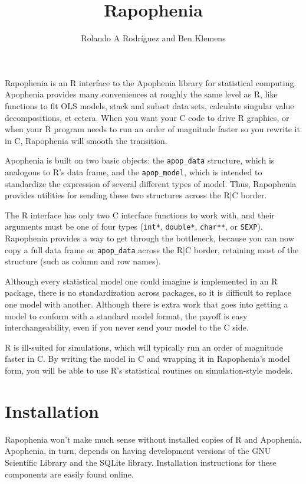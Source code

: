 \documentclass{article}
\begin{document}
\author{Rolando A Rodr\'iguez and Ben Klemens}
\title{Rapophenia}
\def\ad{{\tt apop\_data}\xspace}
\def\am{{\tt apop\_model}\xspace}
\maketitle

Rapophenia is an R interface to the Apophenia library for statistical
computing. Apophenia provides many conveniences at roughly the same level as R,
like functions to fit OLS models, stack and subset data sets, calculate singular
value decompositions, et cetera. When you want your C code to drive R graphics, or
when your R program needs to run an order of magnitude faster so you rewrite it in C,
Rapophenia will smooth the transition.

Apophenia is built on two basic objects: the \ad structure, which is
analogous to R's data frame, and the \am, which is intended to standardize
the expression of several different types of model. Thus, Rapophenia provides utilities
for sending these two structures across the R|C border.

The R interface has only two C interface functions to work with, and their arguments
must be one of four types ({\tt int*}, {\tt double*}, {\tt char**}, or {\tt SEXP}).
Rapophenia provides a way to get through the bottleneck, because you can now copy a
full data frame or \ad across the R|C border, retaining most of the structure (such as
column and row names).

Although every statistical model one could imagine is implemented in an R package, there
is no standardization across packages, so it is difficult to replace one model with
another. Although there is extra work that goes into getting a model to conform with a
standard model format, the payoff is easy interchangeability, even if you never send your
model to the C side. 

R is ill-suited for simulations, which will typically run an order of magnitude faster in
C. By writing the model in C and wrapping it in Rapophenia's model form, you will be able
to use R's statistical routines on simulation-style models.

\section{Installation} Rapophenia won't make much sense without installed copies of R and
Apophenia. Apophenia, in turn, depends on having development versions of the GNU
Scientific Library and the SQLite library. Installation instructions for these components
are easily found online.
\end{document}
